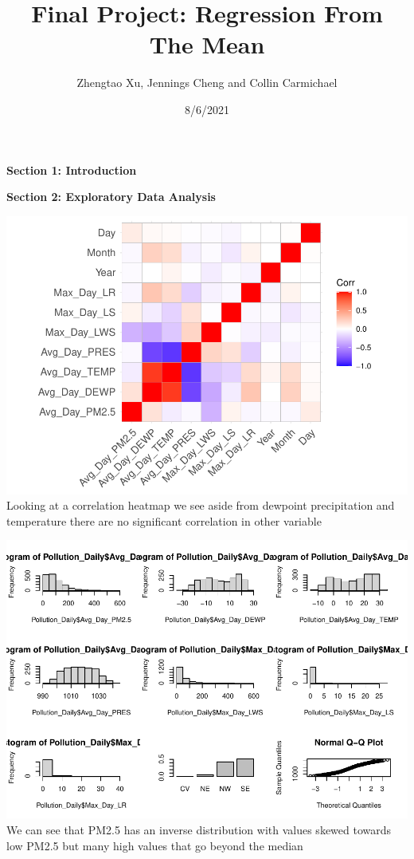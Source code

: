 \documentclass[
]{article}
\title{Final Project: Regression From The Mean}
\author{Zhengtao Xu, Jennings Cheng and Collin Carmichael}
\date{8/6/2021}
\begin{document}
\maketitle

\textbf{Section 1: Introduction}

\textbf{Section 2: Exploratory Data Analysis}

\includegraphics{Final_Project_2_files/figure-latex/unnamed-chunk-3-1.pdf}
Looking at a correlation heatmap we see aside from dewpoint
precipitation and temperature there are no significant correlation in
other variable

\includegraphics{Final_Project_2_files/figure-latex/unnamed-chunk-4-1.pdf}
We can see that PM2.5 has an inverse distribution with values skewed
towards low PM2.5 but many high values that go beyond the median
\end{document}
